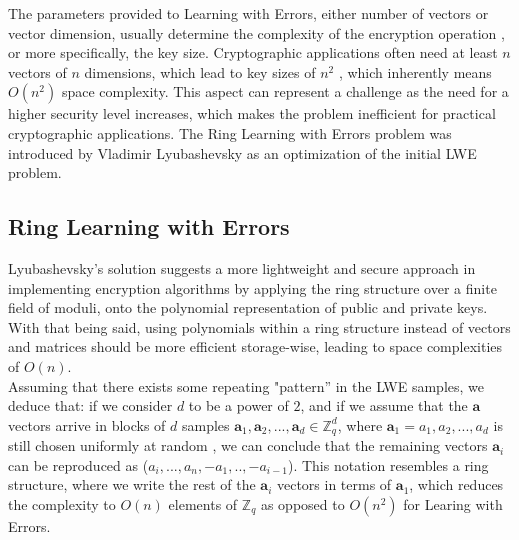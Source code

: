 \documentclass[11pt,
  titlepage=false,
  abstract=on,
]{scrreprt}
\begin{document}
The parameters provided to Learning with Errors, either number of vectors or vector dimension, usually determine the complexity of the encryption operation \cite{micciancio2013hardness}, or more specifically, the key size. 
Cryptographic applications often need at least  $n$ vectors of $n$ dimensions, which lead to key sizes of $n^2$ \cite{regev2010learning}, which inherently means $O(n^{2})$ space complexity. This aspect can represent a challenge as the need for a higher 
security level increases, which makes the problem inefficient for practical cryptographic applications.
The Ring Learning with Errors problem \cite{lyubashevsky2010ideal} was introduced by Vladimir Lyubashevsky as an optimization of the initial LWE problem.

\subsection{Ring Learning with Errors}
Lyubashevsky's solution \cite{lyubashevsky2010ideal} suggests a more lightweight and secure approach in implementing encryption algorithms by applying the ring structure over a finite field of moduli, onto the polynomial representation 
of public and private keys. With that being said, using polynomials within a ring structure instead of vectors and matrices should be more efficient storage-wise, leading to space complexities of $O(n)$.\\

Assuming that there exists some repeating "pattern'' in the LWE samples, we deduce that: if we consider $d$ to be a power of $2$, and if we assume that the $\mathbf{a}$ vectors arrive in blocks of $d$ samples
$\mathbf{a}_1, \mathbf{a}_2,..., \mathbf{a}_d \in \mathbb{Z}^d_q$, where $\mathbf{a}_1 = a_1, a_2,..., a_d$ is still chosen uniformly at random , we can conclude that the remaining vectors $\mathbf{a}_i$
can be reproduced as ($a_i,..., a_n, -a_1,..,-a_{i-1}$). This notation resembles a ring structure, where we write the rest of the $\mathbf{a}_i$ vectors in terms of $\mathbf{a}_1$, which reduces the 
complexity to $O(n)$ elements of $\mathbb{Z}_q$ as opposed to $O(n^2)$ for Learing with Errors.
\end{document}
